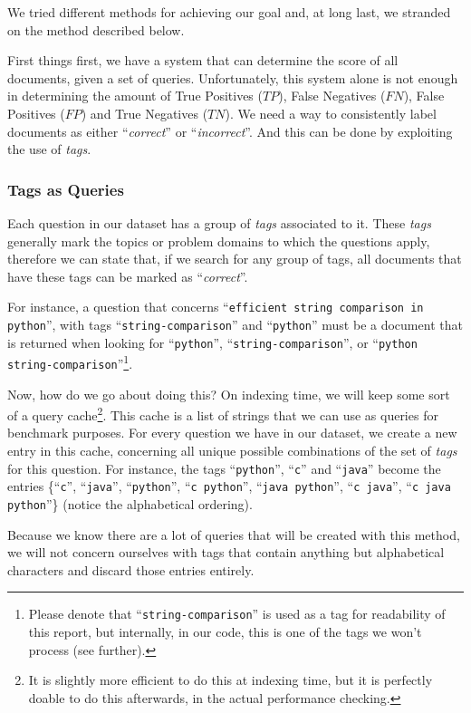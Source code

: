 \documentclass[11pt]{article}
\begin{document}
We tried different methods for achieving our goal and, at long last, we stranded on the method described below.

First things first, we have a system that can determine the score of all documents, given a set of queries. Unfortunately, this system alone is not enough in determining the amount of True Positives ($TP$), False Negatives ($FN$), False Positives ($FP$) and True Negatives ($TN$). We need a way to consistently label documents as either ``\textit{correct}'' or ``\textit{incorrect}''. And this can be done by exploiting the use of \textit{tags}.

\subsubsection{Tags as Queries}
Each question in our dataset has a group of \textit{tags} associated to it. These \textit{tags} generally mark the topics or problem domains to which the questions apply, therefore we can state that, if we search for any group of tags, all documents that have these tags can be marked as ``\textit{correct}''.

For instance, a question that concerns ``\texttt{efficient string comparison in python}'', with tags ``\texttt{string-comparison}'' and ``\texttt{python}'' must be a document that is returned when looking for ``\texttt{python}'', ``\texttt{string-comparison}'', or ``\texttt{python string-comparison}''\footnote{Please denote that ``\texttt{string-comparison}'' is used as a tag for readability of this report, but internally, in our code, this is one of the tags we won't process (see further).}.

Now, how do we go about doing this? On indexing time, we will keep some sort of a query cache\footnote{It is slightly more efficient to do this at indexing time, but it is perfectly doable to do this afterwards, in the actual performance checking.}. This cache is a list of strings that we can use as queries for benchmark purposes. For every question we have in our dataset, we create a new entry in this cache, concerning all unique possible combinations of the set of \textit{tags} for this question. For instance, the tags ``\texttt{python}'', ``\texttt{c}'' and ``\texttt{java}'' become the entries \{``\texttt{c}'', ``\texttt{java}'', ``\texttt{python}'', ``\texttt{c python}'', ``\texttt{java python}'', ``\texttt{c java}'', ``\texttt{c java python}''\} (notice the alphabetical ordering).

Because we know there are a lot of queries that will be created with this method, we will not concern ourselves with tags that contain anything but alphabetical characters and discard those entries entirely.
\end{document}
